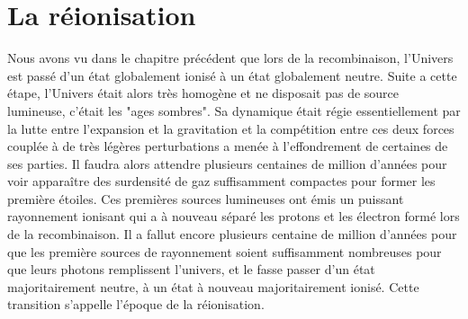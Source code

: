 \chapter{La réionisation} 
\label{sec:introreio}
%
%
%
%

Nous avons vu dans le chapitre précédent que lors de la recombinaison, l'Univers est passé d'un état globalement ionisé à un état globalement neutre.
Suite a cette étape, l'Univers était alors très homogène et ne disposait pas de source lumineuse, c'était les "ages sombres".
Sa dynamique était régie essentiellement par la lutte entre l'expansion et la gravitation et la compétition entre ces deux forces couplée à de très légères perturbations a menée à l'effondrement de certaines de ses parties.
Il faudra alors attendre plusieurs centaines de million d'années pour voir apparaître des surdensité de gaz suffisamment compactes pour former les première étoiles.
Ces premières sources lumineuses ont émis un puissant rayonnement ionisant qui a à nouveau séparé les protons et les électron formé lors de la recombinaison.
Il a fallut encore plusieurs centaine de million d'années pour que les première sources de rayonnement soient suffisamment nombreuses pour que leurs photons remplissent l'univers, et le fasse passer d'un état majoritairement neutre, à un état à nouveau majoritairement ionisé. 
Cette transition s'appelle l’époque de la réionisation.





